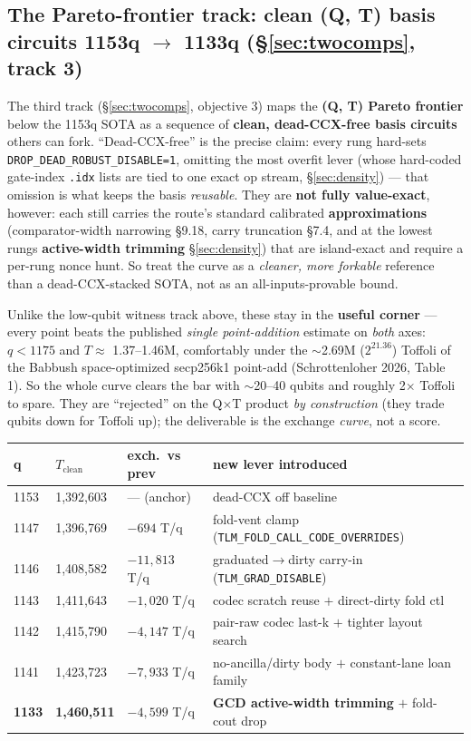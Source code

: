 \documentclass[11pt,a4paper]{article}
\begin{document}
\subsection{The Pareto-frontier track: clean (Q, T) basis circuits 1153q $\to$ 1133q (\S\ref{sec:twocomps}, track 3)}
\label{sec:paretopush}

The third track (\S\ref{sec:twocomps}, objective 3) maps the \textbf{(Q, T) Pareto frontier} below the
1153q SOTA as a sequence of \textbf{clean, dead-CCX-free basis circuits} others can fork.
``Dead-CCX-free'' is the precise claim: every rung hard-sets \texttt{DROP\_DEAD\_ROBUST\_DISABLE=1},
omitting the most overfit lever (whose hard-coded gate-index \texttt{.idx} lists are tied to one exact
op stream, \S\ref{sec:density}) --- that omission is what keeps the basis \emph{reusable}. They are
\textbf{not fully value-exact}, however: each still carries the route's standard calibrated
\textbf{approximations} (comparator-width narrowing \S9.18, carry truncation \S7.4, and at the lowest
rungs \textbf{active-width trimming} \S\ref{sec:density}) that are island-exact and require a per-rung
nonce hunt. So treat the curve as a \emph{cleaner, more forkable} reference than a dead-CCX-stacked
SOTA, not as an all-inputs-provable bound.

Unlike the low-qubit witness track above, these stay in the \textbf{useful corner} --- every point
beats the published \emph{single point-addition} estimate on \emph{both} axes: $q < 1175$ and
$T \approx$ 1.37--1.46M, comfortably under the $\sim$2.69M ($2^{21.36}$) Toffoli of the Babbush
space-optimized secp256k1 point-add (Schrottenloher 2026, Table 1). So the whole curve clears the bar
with $\sim$20--40 qubits and roughly 2$\times$ Toffoli to spare. They are ``rejected'' on the
Q$\times$T product \emph{by construction} (they trade qubits down for Toffoli up); the deliverable is
the exchange \emph{curve}, not a score.

\begin{center}
\begin{tabular}{p{1.1cm}p{2.2cm}p{2.6cm}p{6.0cm}}
\toprule
\textbf{q} & \textbf{$T_{\text{clean}}$} & \textbf{exch.\ vs prev} & \textbf{new lever introduced} \\
\midrule
1153 & 1,392,603 & --- (anchor) & dead-CCX off baseline \\
1147 & 1,396,769 & $-694$ T/q & fold-vent clamp (\texttt{TLM\_FOLD\_CALL\_CODE\_OVERRIDES}) \\
1146 & 1,408,582 & $-11{,}813$ T/q & graduated$\to$dirty carry-in (\texttt{TLM\_GRAD\_DISABLE}) \\
1143 & 1,411,643 & $-1{,}020$ T/q & codec scratch reuse $+$ direct-dirty fold ctl \\
1142 & 1,415,790 & $-4{,}147$ T/q & pair-raw codec last-k $+$ tighter layout search \\
1141 & 1,423,723 & $-7{,}933$ T/q & no-ancilla/dirty body $+$ constant-lane loan family \\
\textbf{1133} & \textbf{1,460,511} & $-4{,}599$ T/q & \textbf{GCD active-width trimming} $+$ fold-cout drop \\
\bottomrule
\end{tabular}
\end{center}
\end{document}
